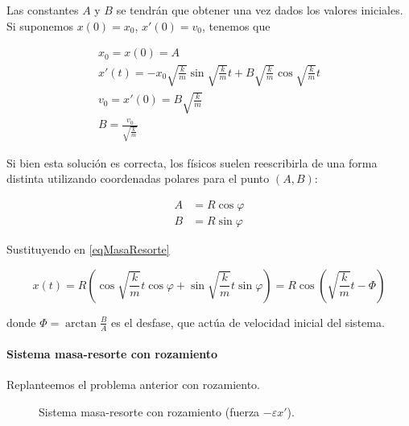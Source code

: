 \documentclass{mathnotes}
\begin{document}
Las constantes $A$ y $B$ se tendrán que obtener una vez dados los valores iniciales. Si suponemos $x(0) = x_0$, $x'(0) = v_0$, tenemos que

\begin{gather*}
x_0 = x(0) = A \\
x'(t) = -x_0 \sqrt{\frac{k}{m}} \sin \sqrt{\frac{k}{m}} t + B \sqrt{\frac{k}{m}}\cos\sqrt{\frac{k}{m}} t \\
v_0 = x'(0) = B \sqrt{\frac{k}{m}} \\
B = \frac{v_0}{\sqrt{\frac{k}{m}}}
\end{gather*}

Si bien esta solución es correcta, los físicos suelen reescribirla de una forma distinta utilizando coordenadas polares para el punto $(A,B)$:

\begin{align*}
A &= R\cos φ \\
B &= R\sin φ 
\end{align*}

Sustituyendo en \eqref{eqMasaResorte}

\[ x(t) = R\left(\cos \sqrt{\frac{k}{m}} t\cos φ + \sin \sqrt{\frac{k}{m}} t \sin φ \right) = R\cos\left(\sqrt{\frac{k}{m}}t - Φ\right) \]

donde $Φ = \arctan \frac{B}{A}$ es el desfase, que actúa de velocidad inicial del sistema.

\paragraph{Sistema masa-resorte con rozamiento}

Replanteemos el problema anterior con rozamiento.
\begin{figure}
\centering
{}
\caption{Sistema masa-resorte con rozamiento (fuerza $-εx'$).}
\end{figure}
\end{document}
